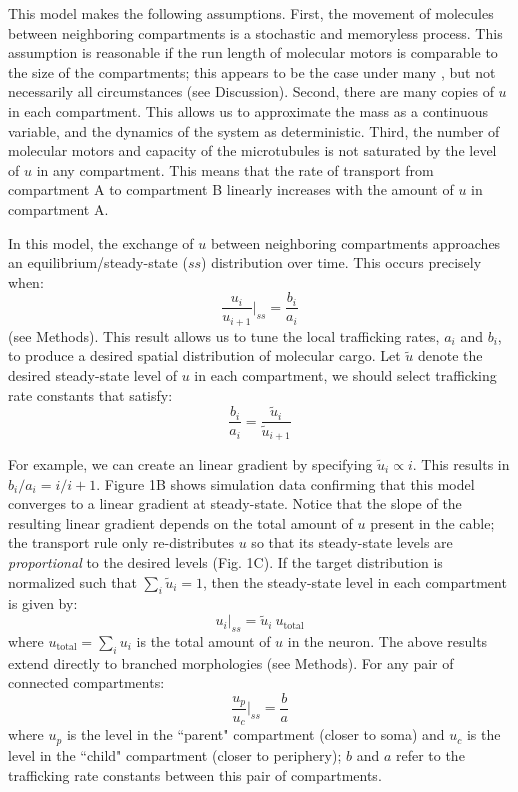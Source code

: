 \documentclass[fleqn,10pt]{wlpeerj}
\begin{document}
This model makes the following assumptions. First, the movement of molecules between neighboring compartments is a stochastic and memoryless process. This assumption is reasonable if the run length of molecular motors is comparable to the size of the compartments; this appears to be the case under many \citep{Muller_2008,Verbrugge_2009}, but not necessarily all \citep{Dynes_2007} circumstances (see Discussion). Second, there are many copies of $u$ in each compartment. This allows us to approximate the mass as a continuous variable, and the dynamics of the system as deterministic. Third, the number of molecular motors and capacity of the microtubules is not saturated by the level of $u$ in any compartment. This means that the rate of transport from compartment A to compartment B linearly increases with the amount of $u$ in compartment A.

In this model, the exchange of $u$ between neighboring compartments approaches an equilibrium/steady-state ($ss$) distribution over time. This occurs precisely when:
$$
\frac{u_i}{u_{i+1}} \Bigg|_{ss} = \frac{b_i}{a_i}
$$
(see Methods). This result allows us to tune the local trafficking rates, $a_i$ and $b_i$, to produce a desired spatial distribution of molecular cargo. Let $\tilde{u}$ denote the desired steady-state level of $u$ in each compartment, we should select trafficking rate constants that satisfy:
$$
\frac{b_i}{a_i} = \frac{\tilde{u}_i}{\tilde{u}_{i+1}}
$$

For example, we can create an linear gradient by specifying $\tilde{u}_i \propto i$. This results in $b_i / a_i =  i / i+1$. Figure 1B shows simulation data confirming that this model converges to a linear gradient at steady-state. Notice that the slope of the resulting linear gradient depends on the total amount of $u$ present in the cable; the transport rule only re-distributes $u$ so that its steady-state levels are \textit{proportional} to the desired levels (Fig. 1C). If the target distribution is normalized such that $\sum_i \tilde{u}_i = 1$, then the steady-state level in each compartment is given by:
$$
u_i \Big|_{ss} = \tilde{u}_i~ u_{\text{total}}
$$
where $u_{\text{total}} = \sum_i u_i$ is the total amount of $u$ in the neuron. The above results extend directly to branched morphologies (see Methods). For any pair of connected compartments:
$$
\frac{u_p}{u_c} \Bigg|_{ss} = \frac{b}{a}
$$
where $u_p$ is the level in the ``parent" compartment (closer to soma) and $u_c$ is the level in the ``child" compartment (closer to periphery); $b$ and $a$ refer to the trafficking rate constants between this pair of compartments.
\end{document}
